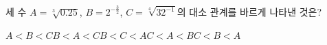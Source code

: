 세 수 $A=\sqrt[3]{0.25}$, $B=2^{-\frac{3}{2}}$, $C=\sqrt[4]{32^{-1}}$의 대소 관계를 바르게 나타낸 것은?
\begin{choices32}{$A<B<C$}{$B<A<C$}{$B<C<A$}{$C<A<B$}{$C<B<A$}\end{choices32}
